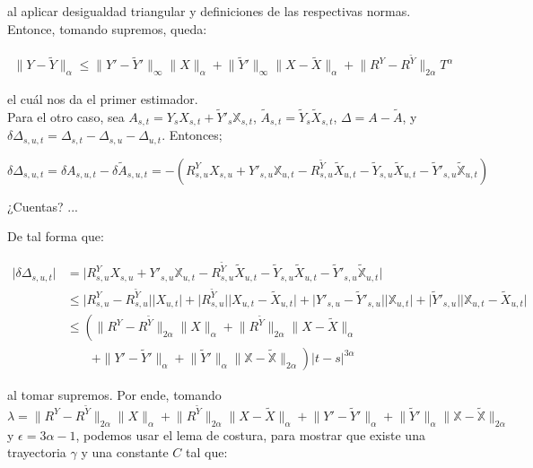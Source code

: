 al aplicar desigualdad triangular y definiciones de las respectivas normas. Entonce, tomando supremos, queda:

\begin{align*}
	\lVert Y - \tilde{Y} \rVert_{ \alpha } \leq \lVert Y' - \tilde{Y}' \rVert_{\infty} \lVert X \rVert_{\alpha} + \lVert \tilde{Y}' \rVert_{ \infty } \lVert X - \tilde{X} \rVert_{ \alpha } + \lVert R^Y - R^{\tilde{Y}} \rVert_{2 \alpha} T^{\alpha}
\end{align*}

el cuál nos da el primer estimador. \\

Para el otro caso, sea $A_{s,t} = Y_s X_{s,t} + \tilde{Y}'_s \mathbb{X}_{s,t} $, $\tilde{A}_{s,t} = \tilde{Y}_s \tilde{X}_{s,t}$, $\Delta = A - \tilde{A}$, y $\delta \Delta_{s,u,t} = \Delta_{s,t} - \Delta_{s,u} - \Delta_{u,t}$. Entonces;

\[
	\delta \Delta_{s,u,t} = \delta A_{s,u,t} - \delta \tilde{A}_{s,u,t} = - \left( R^Y_{s,u} X_{s,u} + Y'_{s,u} \mathbb{X}_{u,t} - R^{\tilde{Y}}_{s,u} \tilde{X}_{u,t} - \tilde{Y}_{s,u} \tilde{X}_{u,t} - \tilde{Y}'_{s,u} \tilde{ \mathbb{X} }_{u,t} \right)
\]

¿Cuentas? ...

De tal forma que:

\begin{align*}
	\lvert \delta \Delta_{s,u,t} \rvert &= \lvert R^Y_{s,u} X_{s,u} + Y'_{s,u} \mathbb{X}_{u,t} - R^{\tilde{Y}}_{s,u} \tilde{X}_{u,t} - \tilde{Y}_{s,u} \tilde{X}_{u,t} - \tilde{Y}'_{s,u} \tilde{ \mathbb{X} }_{u,t} \rvert \\
	&\leq \lvert R^Y_{s,u} - R^{\tilde{Y}}_{s,u} \rvert \lvert X_{u,t} \rvert + \lvert R^{ \tilde{Y} }_{s,u} \rvert \lvert X_{u,t} - \tilde{X}_{u,t} \rvert + \lvert Y'_{s,u} - \tilde{Y}'_{s,u} \rvert \lvert \mathbb{X}_{u,t} \rvert + \lvert \tilde{Y}'_{s,u} \rvert \lvert \mathbb{X}_{u,t} - \tilde{X}_{u,t} \rvert \\
	&\leq \left( \lVert R^Y - R^{ \tilde{Y} } \rVert_{2 \alpha} \lVert X \rVert_{\alpha} + \lVert R^{ \tilde{Y} } \rVert_{2 \alpha} \lVert X - \tilde{X} \rVert_{\alpha} \right. \\
	&\qquad \left. + \lVert Y' - \tilde{Y}' \rVert_{\alpha} + \lVert \tilde{Y}' \rVert_{\alpha} \lVert \mathbb{X} - \tilde{ \mathbb{X}}  \rVert_{2 \alpha} \right) \lvert t - s \rvert^{3 \alpha}
\end{align*}

al tomar supremos. Por ende, tomando $\lambda = \lVert R^Y - R^{ \tilde{Y} } \rVert_{2 \alpha} \lVert X \rVert_{\alpha} + \lVert R^{ \tilde{Y} } \rVert_{2 \alpha} \lVert X - \tilde{X} \rVert_{\alpha}  + \lVert Y' - \tilde{Y}' \rVert_{\alpha} + \lVert \tilde{Y}' \rVert_{\alpha} \lVert \mathbb{X} - \tilde{ \mathbb{X}}  \rVert_{2 \alpha}$ y $\epsilon = 3 \alpha - 1 $, podemos usar el lema de costura, para mostrar que existe una trayectoria $\gamma$ y una constante $C$ tal que:

